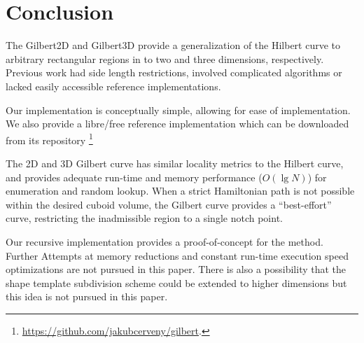 \section{Conclusion}

The Gilbert2D and Gilbert3D provide a generalization of the Hilbert curve to
arbitrary rectangular regions in to two and three dimensions, respectively.
Previous work had side length restrictions, involved complicated algorithms or lacked
easily accessible reference implementations.

Our implementation is conceptually simple, allowing for ease of implementation.
We also provide a libre/free 
reference implementation which can be downloaded from
its repository \footnote{ \label{gilbert-url} \url{https://github.com/jakubcerveny/gilbert}. }

The 2D and 3D Gilbert curve has similar locality metrics to the Hilbert
curve, and provides adequate run-time and memory performance
($O(\lg N)$) for enumeration and random lookup.
When a strict Hamiltonian path is not possible within the desired cuboid volume, the
Gilbert curve provides a ``best-effort'' curve, restricting the inadmissible region
to a single notch point.

Our recursive implementation provides a proof-of-concept for the method.
Further Attempts at memory reductions and constant run-time execution speed optimizations are not pursued in this paper.
There is also a possibility that the shape template subdivision scheme could be extended to higher dimensions but this idea is not
pursued in this paper.




